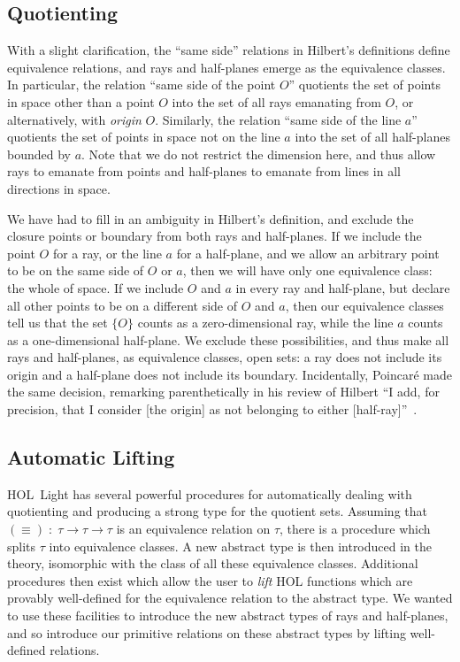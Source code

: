 \subsection{Quotienting}\label{sec:RayQuotienting}
With a slight clarification, the ``same side'' relations in Hilbert's definitions define equivalence relations, and rays and half-planes emerge as the equivalence classes. In particular, the relation ``same side of the point $O$'' quotients the set of points in space other than a point $O$ into the set of all rays emanating from $O$, or alternatively, with \emph{origin} $O$. Similarly, the relation ``same side of the line $a$'' quotients the set of points in space not on the line $a$ into the set of all half-planes bounded by $a$. Note that we do not restrict the dimension here, and thus allow rays to emanate from points and half-planes to emanate from lines in all directions in space. 

We have had to fill in an ambiguity in Hilbert's definition, and exclude the closure points or boundary from both rays and half-planes. If we include the point $O$ for a ray, or the line $a$ for a half-plane, and we allow an arbitrary point to be on the same side of $O$ or $a$, then we will have only one equivalence class: the whole of space. If we include $O$ and $a$ in every ray and half-plane, but declare all other points to be on a different side of $O$ and $a$, then our equivalence classes tell us that the set $\{O\}$ counts as a zero-dimensional ray, while the line $a$ counts as a one-dimensional half-plane. We exclude these possibilities, and thus make all rays and half-planes, as equivalence classes, open sets: a ray does not include its origin and a half-plane does not include its boundary. Incidentally, Poincar\'{e} made the same decision, remarking parenthetically in his review of Hilbert ``I add, for precision, that I consider [the origin] as not belonging to either [half-ray]''~\cite{PoincareReview}.

\subsection{Automatic Lifting}
HOL~Light has several powerful procedures for automatically dealing with quotienting and producing a strong type for the quotient sets. Assuming that $(\equiv)\;:\;\tau\rightarrow \tau \rightarrow \tau$ is an equivalence relation on $\tau$, there is a procedure which splits $\tau$ into equivalence classes. A new abstract type is then introduced in the theory, isomorphic with the class of all these equivalence classes. Additional procedures then exist which allow the user to \emph{lift} HOL functions which are provably well-defined for the equivalence relation to the abstract type. We wanted to use these facilities to introduce the new abstract types of rays and half-planes, and so introduce our primitive relations on these abstract types by lifting well-defined relations. 

